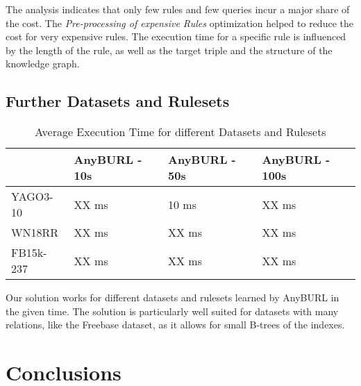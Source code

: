 \documentclass[english]{lni}
\begin{document}
The analysis indicates that only few rules and few queries incur a major share of the cost. The \textit{Pre-processing of expensive Rules} optimization helped to reduce the cost for very expensive rules. The execution time for a specific rule is influenced by the length of the rule, as well as the target triple and the structure of the knowledge graph.

\subsection{Further Datasets and Rulesets}

\begin{table}
\centering
\begin{tabular}{llll}
\toprule
 & AnyBURL - 10s & AnyBURL - 50s & AnyBURL - 100s\\
\midrule
YAGO3-10 & XX ms & 10 ms & XX ms\\
WN18RR & XX ms & XX ms & XX ms\\
FB15k-237 & XX ms & XX ms & XX ms\\
\bottomrule
\end{tabular}
\caption{Average Execution Time for different Datasets and Rulesets}
\label{tab:further-datasets}
\end{table}

Our solution works for different datasets and rulesets learned by AnyBURL in the given time. The solution is particularly well suited for datasets with many relations, like the Freebase dataset, as it allows for small B-trees of the indexes.






\section{Conclusions}

%
%
\end{document}
